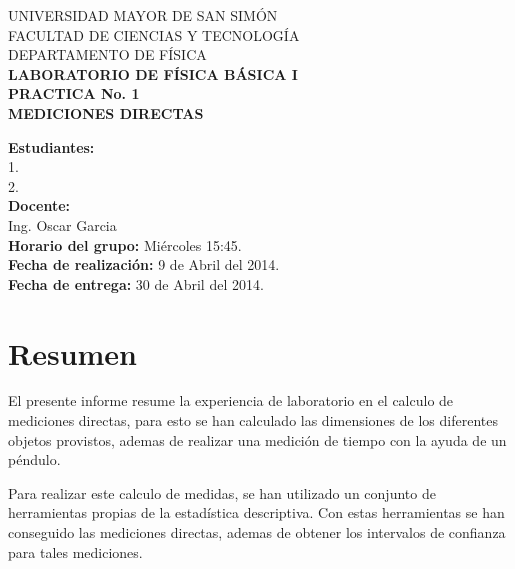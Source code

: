 \documentclass[letter,twoside,11pt]{article}
\newcommand{\blankpage}{
\newpage
\thispagestyle{empty}
\mbox{}
\newpage
}
\begin{document}
\begin{titlepage}
\begin{center}
{\Large UNIVERSIDAD MAYOR DE SAN SIMÓN}\\
\vspace*{0.15cm}
{\large FACULTAD DE CIENCIAS Y TECNOLOGÍA}\\
\vspace*{0.10cm}
DEPARTAMENTO DE FÍSICA\\
\vspace*{3.0cm}
{\Large \textbf{LABORATORIO DE FÍSICA BÁSICA I}}\\
\vspace*{0.3cm}
{\Large \textbf{PRACTICA No. 1}}\\
\vspace*{3.5cm}
{\Large \textbf{MEDICIONES DIRECTAS}}\\
\end{center}

\vspace*{6.0cm}
\leftskip=7.95cm
\noindent
\textbf{Estudiantes:}\\
1. \\
2. \\
\newline
\textbf{Docente:}\\
Ing. Oscar Garcia\\
\newline
\textbf{Horario del grupo:} Miércoles 15:45.\\
\textbf{Fecha de realización:} 9 de Abril del 2014.\\
\textbf{Fecha de entrega:} 30 de Abril del 2014.\\

\end{titlepage}

\blankpage

\section{Resumen}
El presente informe resume la experiencia de laboratorio en el calculo de
mediciones directas, para esto se han calculado las dimensiones de los
diferentes objetos provistos, ademas de realizar una medición de tiempo con la
ayuda de un péndulo.

Para realizar este calculo de medidas, se han utilizado un conjunto de
herramientas propias de la estadística descriptiva. Con estas herramientas se
han conseguido las mediciones directas, ademas de obtener los intervalos de
confianza para tales mediciones.
\end{document}
